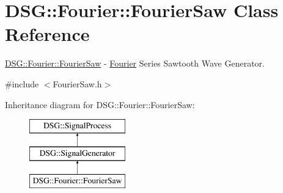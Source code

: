 \hypertarget{class_d_s_g_1_1_fourier_1_1_fourier_saw}{\section{D\+S\+G\+:\+:Fourier\+:\+:Fourier\+Saw Class Reference}
\label{class_d_s_g_1_1_fourier_1_1_fourier_saw}
}


\hyperlink{class_d_s_g_1_1_fourier_1_1_fourier_saw}{D\+S\+G\+::\+Fourier\+::\+Fourier\+Saw} -\/ \hyperlink{namespace_d_s_g_1_1_fourier}{Fourier} Series Sawtooth Wave Generator.  




{\ttfamily \#include $<$Fourier\+Saw.\+h$>$}

Inheritance diagram for D\+S\+G\+:\+:Fourier\+:\+:Fourier\+Saw\+:\begin{figure}[H]
\begin{center}
\leavevmode
\includegraphics[height=3.000000cm]{class_d_s_g_1_1_fourier_1_1_fourier_saw}
\end{center}
\end{figure}
